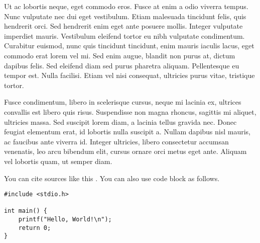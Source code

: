 Ut ac lobortis neque, eget commodo eros. Fusce at enim a odio viverra tempus. Nunc vulputate nec dui eget vestibulum. Etiam malesuada tincidunt felis, quis hendrerit orci. Sed hendrerit enim eget ante posuere mollis. Integer vulputate imperdiet mauris. Vestibulum eleifend tortor eu nibh vulputate condimentum. Curabitur euismod, nunc quis tincidunt tincidunt, enim mauris iaculis lacus, eget commodo erat lorem vel mi. Sed enim augue, blandit non purus at, dictum dapibus felis. Sed eleifend diam sed purus pharetra aliquam. Pellentesque eu tempor est. Nulla facilisi. Etiam vel nisi consequat, ultricies purus vitae, tristique tortor.

Fusce condimentum, libero in scelerisque cursus, neque mi lacinia ex, ultrices convallis est libero quis risus. Suspendisse non magna rhoncus, sagittis mi aliquet, ultricies massa. Sed suscipit lorem diam, a lacinia tellus gravida nec. Donec feugiat elementum erat, id lobortis nulla suscipit a. Nullam dapibus nisl mauris, ac faucibus ante viverra id. Integer ultricies, libero consectetur accumsan venenatis, leo arcu bibendum elit, cursus ornare orci metus eget ante. Aliquam vel lobortis quam, ut semper diam. 

You can cite sources like this \cite{knuth1984}. You can also use code block as follows.

\begin{verbatim}
#include <stdio.h>

int main() {
    printf("Hello, World!\n");
    return 0;
}
\end{verbatim}
